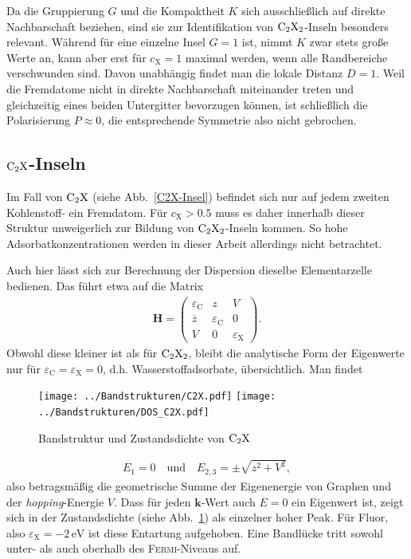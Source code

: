 \documentclass[a4paper, 10pt, twoside, openany]{book} %
\def \vec {\boldsymbol}
\def \eC {\varepsilon_\mathrm{C}}
\def \eX {\varepsilon_\mathrm{X}}
\def \cX {c_\mathrm{X}}
\begin{document}
	Da die Gruppierung $G$ und die Kompaktheit $K$ sich ausschließlich auf direkte Nachbarschaft beziehen, sind sie zur Identifikation von $\rm C_2X_2$-Inseln besonders relevant. Während für eine einzelne Insel $G = 1$ ist, nimmt $K$ zwar stets große Werte an, kann aber erst für $\cX = 1$ maximal werden, wenn alle Randbereiche verschwunden sind. Davon unabhängig findet man die lokale Distanz $D = 1$. Weil die Fremdatome nicht in direkte Nachbarschaft miteinander treten und gleichzeitig eines beiden Untergitter bevorzugen können, ist schließlich die Polarisierung $P \approx 0$, die entsprechende Symmetrie also nicht gebrochen.
	
	\subsection{$\rm C_2X$-Inseln}
	
	Im Fall von $\rm C_2X$ (siehe Abb.~\ref{C2X-Insel}) befindet sich nur auf jedem zweiten Kohlenstoff- ein Fremdatom. Für $\cX > 0.5$ muss es daher innerhalb dieser Struktur unweigerlich zur Bildung von $\rm C_2X_2$-Inseln kommen. So hohe Adsorbatkonzentrationen werden in dieser Arbeit allerdings nicht betrachtet.
	
	Auch hier lässt sich zur Berechnung der Dispersion dieselbe Elementarzelle bedienen. Das führt etwa auf die Matrix
	\begin{align*}
		\vec H =
		\begin{pmatrix}
			\eC         & z   & V \\
			\overline z & \eC & 0 \\
			V           & 0   & \eX
		\end{pmatrix}.
	\end{align*}
	Obwohl diese kleiner ist als für $\rm C_2X_2$, bleibt die analytische Form der Eigenwerte nur für $\eC = \eX = 0$, d.h. Wasserstoffadsorbate, übersichtlich. Man findet
	\begin{figure}
		\texttt{[image: ../Bandstrukturen/C2X.pdf]}
		\hfill
		\texttt{[image: ../Bandstrukturen/DOS\_C2X.pdf]}
		\caption{Bandstruktur und Zustandsdichte von $\rm C_2X$}
		\label{C2X}
	\end{figure}
	\begin{align*}
		E_1 = 0 \quad \text{und} \quad E_{2, 3} = \pm \sqrt{z^2 + V^2},
	\end{align*}
	also betragsmäßig die geometrische Summe der Eigenenergie von Graphen und der \emph{hopping}-Energie $V$. Dass für jeden $\vec k$-Wert auch $E = 0$ ein Eigenwert ist, zeigt sich in der Zustandsdichte (siehe Abb.~\ref{C2X}) als einzelner hoher Peak. Für Fluor, also $\eX = -2\,\mathrm{eV}$ ist diese Entartung aufgehoben. Eine Bandlücke tritt sowohl unter- als auch oberhalb des \textsc{Fermi}-Niveaus auf.
	
\end{document}
